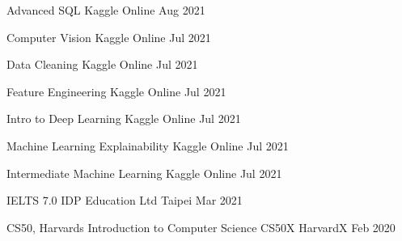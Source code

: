 

\begin{cvhonors}

  \cvhonor
    {Advanced SQL} %
    {Kaggle} %
    {Online} %
    {Aug 2021} %

  \cvhonor
    {Computer Vision} %
    {Kaggle} %
    {Online} %
    {Jul 2021} %

  \cvhonor
    {Data Cleaning} %
    {Kaggle} %
    {Online} %
    {Jul 2021} %
    
  \cvhonor
    {Feature Engineering} %
    {Kaggle} %
    {Online} %
    {Jul 2021} %
    
  \cvhonor
    {Intro to Deep Learning} %
    {Kaggle} %
    {Online} %
    {Jul 2021} %

  \cvhonor
    {Machine Learning Explainability} %
    {Kaggle} %
    {Online} %
    {Jul 2021} %
    
  \cvhonor
    {Intermediate Machine Learning} %
    {Kaggle} %
    {Online} %
    {Jul 2021} %

  \cvhonor
    {IELTS 7.0} %
    {IDP Education Ltd} %
    {Taipei} %
    {Mar 2021} %
    
  \cvhonor
    {CS50, Harvards Introduction to Computer Science} %
    {CS50X} %
    {HarvardX} %
    {Feb 2020} %
\end{cvhonors}
